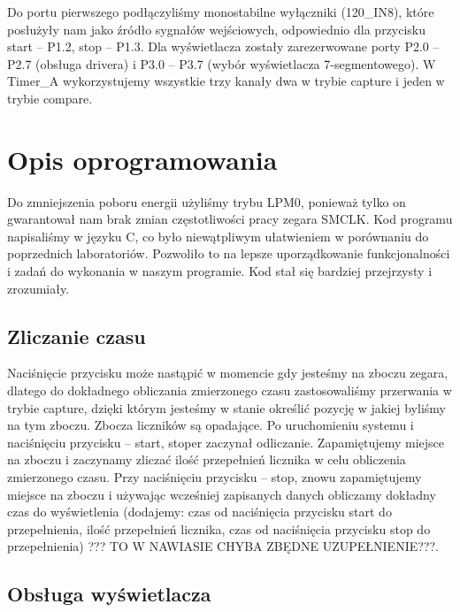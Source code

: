 \documentclass[a4paper,titlepage,11pt,floatssmall]{mwrep}
\begin{document}
Do portu pierwszego podłączyliśmy monostabilne wyłączniki (120_IN8), które posłużyły nam jako źródło sygnałów wejściowych, odpowiednio dla przycisku start – P1.2,  stop – P1.3. Dla wyświetlacza zostały zarezerwowane porty P2.0 – P2.7 (obsługa drivera) i P3.0 – P3.7 (wybór wyświetlacza 7-segmentowego). W Timer_A wykorzystujemy wszystkie trzy kanały dwa w trybie capture i jeden w trybie compare. 

\section{Opis oprogramowania}

Do zmniejszenia poboru energii użyliśmy trybu LPM0, ponieważ tylko on gwarantował nam brak zmian częstotliwości pracy zegara SMCLK. Kod programu napisaliśmy w języku C, co było niewątpliwym ułatwieniem w porównaniu do poprzednich laboratoriów.  Pozwoliło to na lepsze uporządkowanie funkcjonalności i zadań do wykonania w naszym programie. Kod stał się bardziej przejrzysty i zrozumiały. 

\subsection{Zliczanie czasu}
\indent 

Naciśnięcie przycisku może nastąpić w momencie gdy jesteśmy na zboczu zegara, dlatego do dokładnego obliczania zmierzonego czasu zastosowaliśmy przerwania w trybie capture, dzięki którym jesteśmy w stanie określić pozycję w jakiej byliśmy na tym zboczu.  Zbocza liczników są opadające. Po uruchomieniu systemu i naciśnięciu przycisku – start, stoper zaczynał odliczanie. Zapamiętujemy miejsce na zboczu i zaczynamy zliczać ilość przepełnień licznika w celu obliczenia zmierzonego czasu. Przy naciśnięciu przycisku – stop, znowu zapamiętujemy miejsce na zboczu i używając wcześniej zapisanych danych obliczamy dokładny czas do wyświetlenia (dodajemy: czas od naciśnięcia przycisku start do przepełnienia, ilość przepełnień licznika, czas od naciśnięcia przycisku stop do przepełnienia) ??? TO W NAWIASIE CHYBA ZBĘDNE UZUPEŁNIENIE???. 

\subsection{Obsługa wyświetlacza}
\indent 
\end{document}

